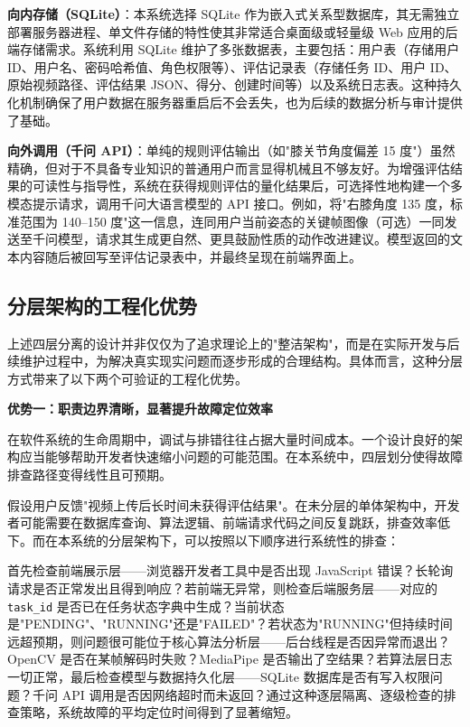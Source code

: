 \begin{chineseenum}
  \item \textbf{向内存储（SQLite）}：本系统选择 SQLite 作为嵌入式关系型数据库，其无需独立部署服务器进程、单文件存储的特性使其非常适合桌面级或轻量级 Web 应用的后端存储需求。系统利用 SQLite 维护了多张数据表，主要包括：用户表（存储用户 ID、用户名、密码哈希值、角色权限等）、评估记录表（存储任务 ID、用户 ID、原始视频路径、评估结果 JSON、得分、创建时间等）以及系统日志表。这种持久化机制确保了用户数据在服务器重启后不会丢失，也为后续的数据分析与审计提供了基础。

  \item \textbf{向外调用（千问 API）}：单纯的规则评估输出（如"膝关节角度偏差 15 度"）虽然精确，但对于不具备专业知识的普通用户而言显得机械且不够友好。为增强评估结果的可读性与指导性，系统在获得规则评估的量化结果后，可选择性地构建一个多模态提示请求，调用千问大语言模型的 API 接口。例如，将"右膝角度 135 度，标准范围为 140--150 度"这一信息，连同用户当前姿态的关键帧图像（可选）一同发送至千问模型，请求其生成更自然、更具鼓励性质的动作改进建议。模型返回的文本内容随后被回写至评估记录表中，并最终呈现在前端界面上。
\end{chineseenum}

\subsection{分层架构的工程化优势}

上述四层分离的设计并非仅仅为了追求理论上的"整洁架构"，而是在实际开发与后续维护过程中，为解决真实现实问题而逐步形成的合理结构。具体而言，这种分层方式带来了以下两个可验证的工程化优势。

\textbf{优势一：职责边界清晰，显著提升故障定位效率}

在软件系统的生命周期中，调试与排错往往占据大量时间成本。一个设计良好的架构应当能够帮助开发者快速缩小问题的可能范围。在本系统中，四层划分使得故障排查路径变得线性且可预期。

假设用户反馈"视频上传后长时间未获得评估结果"。在未分层的单体架构中，开发者可能需要在数据库查询、算法逻辑、前端请求代码之间反复跳跃，排查效率低下。而在本系统的分层架构下，可以按照以下顺序进行系统性的排查：

首先检查前端展示层——浏览器开发者工具中是否出现 JavaScript 错误？长轮询请求是否正常发出且得到响应？若前端无异常，则检查后端服务层——对应的 \texttt{task\_id} 是否已在任务状态字典中生成？当前状态是"PENDING"、"RUNNING"还是"FAILED"？若状态为"RUNNING"但持续时间远超预期，则问题很可能位于核心算法分析层——后台线程是否因异常而退出？OpenCV 是否在某帧解码时失败？MediaPipe 是否输出了空结果？若算法层日志一切正常，最后检查模型与数据持久化层——SQLite 数据库是否有写入权限问题？千问 API 调用是否因网络超时而未返回？通过这种逐层隔离、逐级检查的排查策略，系统故障的平均定位时间得到了显著缩短。

